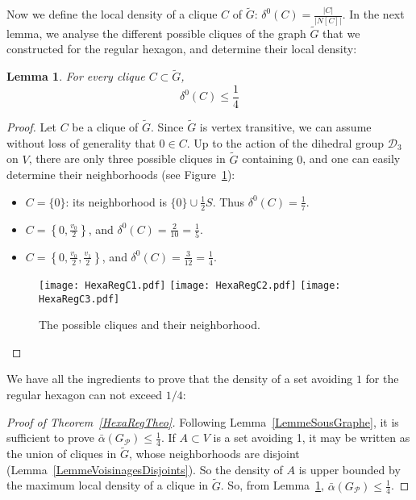 \documentclass{amsart}                     %
\newtheorem{lemm}{Lemma}
\newcommand{\tref}[1]{Theorem~\textup{\ref{#1}}}
\newcommand{\lref}[1]{Lemma~\textup{\ref{#1}}}
\newcommand{\fref}[1]{Figure~\textup{\ref{#1}}}
\begin{document}
Now we define the local density of a clique $C$ of $\tilde{G}$: $\delta^0(C)=\frac{|C|}{|N[C]|}$. In the next lemma, we analyse the different possible cliques of the graph $\tilde{G}$ that we constructed for the regular hexagon, and determine their local density:
\begin{lemm}\label{HexaRegDelta*}
For every clique $C\subset \tilde{G}$, 
$$ \delta^0(C)\leq \frac{1}{4}$$
\end{lemm}
\begin{proof}


Let $C$ be a clique of $\tilde{G}$. Since $\tilde{G}$ is vertex transitive, we can assume without loss of generality that $0\in C$. Up to the action of the dihedral group $\mathcal{D}_3$ on $V$, there are only three possible cliques in $\tilde{G}$ containing $0$, and one can easily determine their neighborhoods (see \fref{HexaRegCliques}):

\begin{itemize}
\item $C=\{0\}$: its neighborhood is $\{0\}\cup \frac{1}{2} S$. Thus $\delta^0(C)=\frac{1}{7}$.

\item $C=\left\{0,\frac{v_0}{2}\right\}$, and $\delta^0(C)=\frac{2}{10}=\frac{1}{5}$.

\item $C=\left\{0,\frac{v_0}{2},\frac{v_1}{2}\right\}$,
and $\delta^0(C)=\frac{3}{12}=\frac{1}{4}$.
\end{itemize}

\begin{figure}[!ht]
\texttt{[image: HexaRegC1.pdf]}\hspace{.6cm}
\texttt{[image: HexaRegC2.pdf]}\hspace{.6cm}
\texttt{[image: HexaRegC3.pdf]}
\caption{The possible cliques and their neighborhood.\label{HexaRegCliques}}
\end{figure}


\end{proof}




We have all the ingredients to prove that the density of a set avoiding $1$ for the regular hexagon can not exceed $1/4$:

\begin{proof}[Proof of \tref{HexaRegTheo}] 
Following \lref{LemmeSousGraphe}, it is sufficient to prove $\bar{\alpha}(G_\mathcal{P})\leq\frac{1}{4}$.
If $A\subset V$ is a set avoiding 1, it may be written as the union of cliques in $\tilde{G}$, whose neighborhoods are disjoint (\lref{LemmeVoisinagesDisjoints}). So the density of $A$ is upper bounded by the maximum local density of a clique in $\tilde{G}$. So, from \lref{HexaRegDelta*}, $\bar{\alpha}(G_\mathcal{P})\leq\frac{1}{4}$. 
\end{proof}
\end{document}
